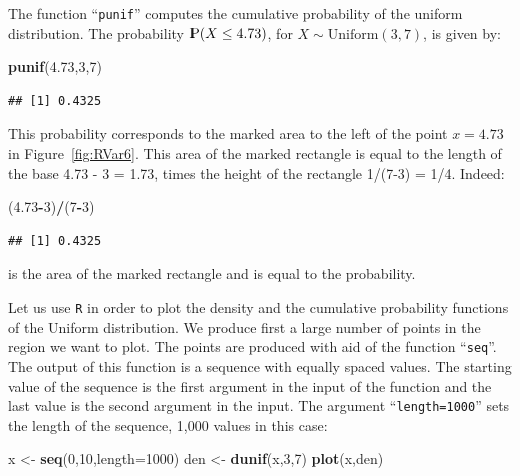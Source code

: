 \documentclass[]{krantz}
\makeatletter
\newenvironment{Shaded}{\begin{snugshade}}{\end{snugshade}}
\newcommand{\KeywordTok}[1]{\textcolor[rgb]{0.13,0.29,0.53}{\textbf{#1}}}
\newcommand{\DataTypeTok}[1]{\textcolor[rgb]{0.13,0.29,0.53}{#1}}
\newcommand{\DecValTok}[1]{\textcolor[rgb]{0.00,0.00,0.81}{#1}}
\newcommand{\FloatTok}[1]{\textcolor[rgb]{0.00,0.00,0.81}{#1}}
\newcommand{\StringTok}[1]{\textcolor[rgb]{0.31,0.60,0.02}{#1}}
\newcommand{\OperatorTok}[1]{\textcolor[rgb]{0.81,0.36,0.00}{\textbf{#1}}}
\newcommand{\NormalTok}[1]{#1}
\newcommand{\Prob}{{\rm I\kern-.3em P}}
\newenvironment{kframe}{%
\medskip{}
\setlength{\fboxsep}{.8em}
 \def\at@end@of@kframe{}%
 \ifinner\ifhmode%
  \def\at@end@of@kframe{\end{minipage}}%
  \begin{minipage}{\columnwidth}%
 \fi\fi%
 \def\FrameCommand##1{\hskip\@totalleftmargin \hskip-\fboxsep
 \colorbox{shadecolor}{##1}\hskip-\fboxsep
     \hskip-\linewidth \hskip-\@totalleftmargin \hskip\columnwidth}%
 \MakeFramed {\advance\hsize-\width
   \@totalleftmargin\z@ \linewidth\hsize
   \@setminipage}}%
 {\par\unskip\endMakeFramed%
 \at@end@of@kframe}
\renewenvironment{Shaded}{\begin{kframe}}{\end{kframe}}
\theoremstyle{definition}
\theoremstyle{definition}
\theoremstyle{definition}
\theoremstyle{remark}
\makeatother
\begin{document}
The function ``\texttt{punif}'' computes the cumulative probability of
the uniform distribution. The probability \(\Prob(X \leq 4.73)\), for
\(X \sim \mathrm{Uniform}(3,7)\), is given by:

\begin{Shaded}
\begin{Highlighting}[]
\KeywordTok{punif}\NormalTok{(}\FloatTok{4.73}\NormalTok{,}\DecValTok{3}\NormalTok{,}\DecValTok{7}\NormalTok{)}
\end{Highlighting}
\end{Shaded}

\begin{verbatim}
## [1] 0.4325
\end{verbatim}

This probability corresponds to the marked area to the left of the point
\(x = 4.73\) in Figure~\ref{fig:RVar6}. This area of the marked
rectangle is equal to the length of the base 4.73 - 3 = 1.73, times the
height of the rectangle 1/(7-3) = 1/4. Indeed:

\begin{Shaded}
\begin{Highlighting}[]
\NormalTok{(}\FloatTok{4.73}\OperatorTok{-}\DecValTok{3}\NormalTok{)}\OperatorTok{/}\NormalTok{(}\DecValTok{7}\OperatorTok{-}\DecValTok{3}\NormalTok{)}
\end{Highlighting}
\end{Shaded}

\begin{verbatim}
## [1] 0.4325
\end{verbatim}

is the area of the marked rectangle and is equal to the probability.

Let us use \texttt{R} in order to plot the density and the cumulative
probability functions of the Uniform distribution. We produce first a
large number of points in the region we want to plot. The points are
produced with aid of the function ``\texttt{seq}''. The output of this
function is a sequence with equally spaced values. The starting value of
the sequence is the first argument in the input of the function and the
last value is the second argument in the input. The argument
``\texttt{length=1000}'' sets the length of the sequence, 1,000 values
in this case:

\begin{Shaded}
\begin{Highlighting}[]
\NormalTok{x <-}\StringTok{ }\KeywordTok{seq}\NormalTok{(}\DecValTok{0}\NormalTok{,}\DecValTok{10}\NormalTok{,}\DataTypeTok{length=}\DecValTok{1000}\NormalTok{)}
\NormalTok{den <-}\StringTok{ }\KeywordTok{dunif}\NormalTok{(x,}\DecValTok{3}\NormalTok{,}\DecValTok{7}\NormalTok{)}
\KeywordTok{plot}\NormalTok{(x,den)}
\end{Highlighting}
\end{Shaded}
\end{document}
